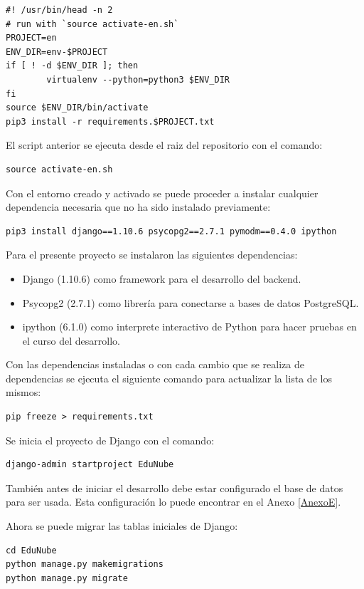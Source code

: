 \begin{lstlisting}
#! /usr/bin/head -n 2
# run with `source activate-en.sh`
PROJECT=en
ENV_DIR=env-$PROJECT
if [ ! -d $ENV_DIR ]; then
        virtualenv --python=python3 $ENV_DIR
fi
source $ENV_DIR/bin/activate
pip3 install -r requirements.$PROJECT.txt
\end{lstlisting}

El script anterior se ejecuta desde el raiz del repositorio con el comando:

\begin{lstlisting}
source activate-en.sh
\end{lstlisting}

Con el entorno creado y activado se puede proceder a instalar cualquier dependencia necesaria que no ha sido instalado previamente:

\begin{lstlisting}[breaklines]
pip3 install django==1.10.6 psycopg2==2.7.1 pymodm==0.4.0 ipython
\end{lstlisting}

Para el presente proyecto se instalaron las siguientes dependencias:
\begin{itemize}
	\item Django (1.10.6) como framework para el desarrollo del backend.
    \item Psycopg2 (2.7.1) como librería para conectarse a bases de datos PostgreSQL.
    \item ipython (6.1.0) como interprete interactivo de Python para hacer pruebas en el curso del desarrollo.
\end{itemize}

Con las dependencias instaladas o con cada cambio que se realiza de dependencias se ejecuta el siguiente comando para actualizar la lista de los mismos:

\begin{lstlisting}
pip freeze > requirements.txt
\end{lstlisting}

Se inicia el proyecto de Django con el comando:

\begin{lstlisting}
django-admin startproject EduNube
\end{lstlisting}

También antes de iniciar el desarrollo debe estar configurado el base de datos para ser usada. Esta configuración lo puede encontrar en el Anexo \ref{AnexoE}.

Ahora se puede migrar las tablas iniciales de Django:
\begin{lstlisting}
cd EduNube
python manage.py makemigrations
python manage.py migrate
\end{lstlisting}

